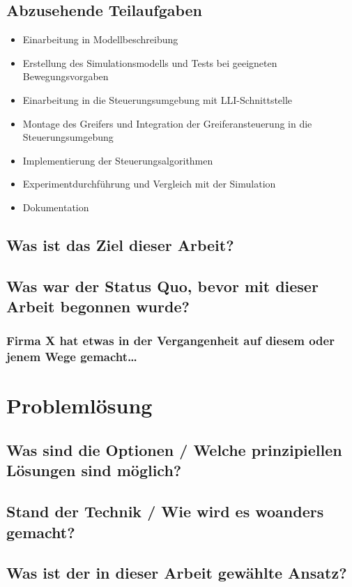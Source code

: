 \documentclass[a4paper,12pt]{article}
\begin{document}
\subsection{Abzusehende Teilaufgaben}
\begin{itemize}
	\item Einarbeitung in Modellbeschreibung
	\item Erstellung des Simulationsmodells und Tests bei geeigneten Bewegungsvorgaben
	\item Einarbeitung in die Steuerungsumgebung mit LLI-Schnittstelle
	\item Montage des Greifers und Integration der Greiferansteuerung in die Steuerungsumgebung
	\item Implementierung der Steuerungsalgorithmen
	\item Experimentdurchführung und Vergleich mit der Simulation
	\item Dokumentation
\end{itemize}
\subsection{Was ist das Ziel dieser Arbeit?}

\subsection{Was war der Status Quo, bevor mit dieser Arbeit begonnen wurde?}

\subsubsection{Firma X hat etwas in der Vergangenheit auf diesem oder jenem Wege gemacht…}

\section{Problemlösung}

\subsection{Was sind die Optionen / Welche prinzipiellen Lösungen sind möglich?}

\subsection{Stand der Technik / Wie wird es woanders gemacht?}

\subsection{Was ist der in dieser Arbeit gewählte Ansatz?}
\end{document}
